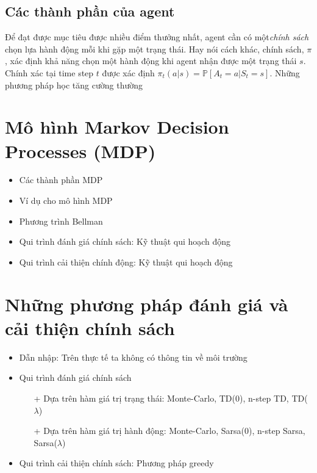 	\subsection{Các thành phần của agent}
	Để đạt được mục tiêu được nhiều điểm thưởng nhất, agent cần có một\textit{chính sách} chọn lựa hành động mỗi khi gặp một trạng thái. Hay nói cách khác, chính sách, $\pi$, xác định khả năng chọn một hành động khi agent nhận được một trạng thái $s$. Chính xác tại time step $t$ được xác định $\pi_t(a|s) = \mathbb{P}[\mathit{A_t} = a|\mathit{S_t} = s]$. Những phương pháp học tăng cường thường 
	
	
\section{Mô hình Markov Decision Processes (MDP)}
	\begin{itemize}
			\item Các thành phần MDP
			\item Ví dụ cho mô hình MDP
			\item Phương trình Bellman
			\item Qui trình đánh giá chính sách: Kỹ thuật qui hoạch động
			\item Qui trình cải thiện chính động: Kỹ thuật qui hoạch động
	\end{itemize}

\section{Những phương pháp đánh giá và cải thiện chính sách}
	\begin{itemize}
		\item Dẫn nhập: Trên thực tế ta không có thông tin về môi trường
		\item Qui trình đánh giá chính sách
			\begin{itemize}
				\item[+] Dựa trên hàm giá trị trạng thái: Monte-Carlo, TD(0), n-step TD, TD($\lambda$)
				\item[+] Dựa trên hàm giá trị hành động: Monte-Carlo, Sarsa(0), n-step Sarsa, Sarsa($\lambda$)
			\end{itemize}
		\item Qui trình cải thiện chính sách: Phương pháp greedy
	\end{itemize}
	
